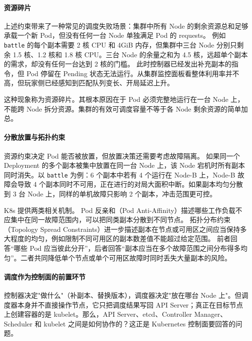 \paragraph{资源碎片}

上述约束带来了一种常见的调度失败场景：集群中所有 Node 的剩余资源总和足够承载一个新 Pod，但没有任何一台 Node 单独满足 Pod 的 requests。
例如 \texttt{battle} 的每个副本需要 2 核 CPU 和 4GiB 内存，但集群中三台 Node 分别只剩余 1.5 核、1.2 核和 1.8 核 CPU。三台 Node 的余量之和为 4.5 核，远超单个副本的需求，却没有任何一台达到 2 核的门槛。
此时控制器已经发出补充副本的指令，但 Pod 停留在 Pending 状态无法运行。从集群监控面板看整体利用率并不高，但玩家侧已经感知到匹配队列变长、开局延迟上升。

这种现象称为资源碎片。其根本原因在于 Pod 必须完整地运行在一台 Node 上，不能跨 Node 拆分资源。集群的有效可调度容量不等于各 Node 剩余资源的简单加总。

\paragraph{分散放置与拓扑约束}

资源约束决定 Pod 能否被放置，但放置决策还需要考虑故障隔离。
如果同一个 Deployment 的多个副本被集中放置在同一台 Node 上，该 Node 宕机时所有副本同时消失。以 \texttt{battle} 为例：6 个副本中若有 4 个运行在 Node-B 上，Node-B 故障会导致 4 个副本同时不可用，正在进行的对局大面积中断。如果副本均匀分散到 3 台 Node 上，同样的单机故障只影响 2 个副本，冲击范围更可控。

K8s 提供两类相关机制。
Pod 反亲和（Pod Anti-Affinity）描述哪些工作负载不应集中在同一故障范围内，可以把同类副本分散到不同节点。
拓扑分布约束（Topology Spread Constraints）进一步描述副本在节点或可用区之间应当保持多大程度的均匀，例如限制不同可用区的副本数差值不能超过给定范围。
前者回答“哪些 Pod 应当彼此分开”，后者回答“副本应当在多个故障范围之间分布得多均匀”。二者共同降低单个节点或单个可用区故障时同时丢失大量副本的风险。

\paragraph{调度作为控制面的前置环节}

控制器决定"做什么"（补副本、替换版本），调度器决定"放在哪台 Node 上"。但调度器本身并不直接操作节点，它只把调度结果写回 API Server；真正在目标节点上创建容器的是 kubelet。那么，API Server、etcd、Controller Manager、Scheduler 和 kubelet 之间是如何协作的？这正是 Kubernetes 控制面要回答的问题。

